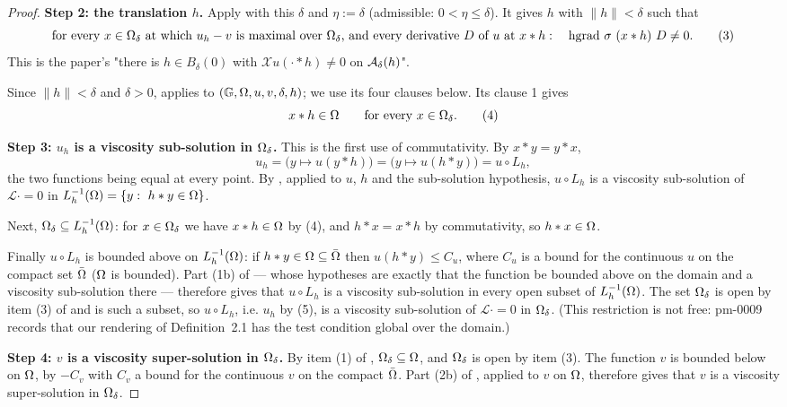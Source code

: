 \begin{proof}
\medskip\noindent\textbf{Step 2: the translation $h$.} Apply
 with this $\delta$ and $\eta:=\delta$ (admissible:
$0<\eta\le\delta$). It gives $h$ with $\|h\|<\delta$ such that
\[
 \text{for every } x\in\Omega_\delta \text{ at which } u_h-v \text{ is maximal over }\Omega_\delta
 \text{, and every derivative } D \text{ of } u \text{ at } x*h:\quad
 \mathrm{hgrad}\ \sigma\ (x*h)\ D\ne0 . \tag{3}
\]
This is the paper's "there is $h\in B_\delta(0)$ with $\mathcal Xu(\cdot*h)\ne0$ on
$\mathcal{A}_\delta(h)$".

Since $\|h\|<\delta$ and $\delta>0$,  applies to
$(\mathbb G,\Omega,u,v,\delta,h)$; we use its four clauses below. Its clause 1 gives
\[
 x*h\in\Omega\qquad\text{for every } x\in\Omega_\delta . \tag{4}
\]

\medskip\noindent\textbf{Step 3: $u_h$ is a viscosity sub-solution in $\Omega_\delta$.} This is
the first use of commutativity. By $x*y=y*x$,
\[
 u_h=\big(y\mapsto u(y*h)\big)=\big(y\mapsto u(h*y)\big)=u\circ L_h , \tag{5}
\]
the two functions being equal at every point. By , applied to
$u$, $h$ and the sub-solution hypothesis, $u\circ L_h$ is a viscosity sub-solution of
$\mathcal L\cdot=0$ in $L_h^{-1}(\Om)=\{y:\ h*y\in\Om\}$.

Next, $\Omega_\delta\subseteq L_h^{-1}(\Omega)$: for $x\in\Omega_\delta$ we have $x*h\in\Omega$ by (4),
and $h*x=x*h$ by commutativity, so $h*x\in\Omega$.

Finally $u\circ L_h$ is bounded above on $L_h^{-1}(\Omega)$: if $h*y\in\Omega\subseteq\bar{\Omega}$ then
$u(h*y)\le C_u$, where $C_u$ is a bound for the continuous $u$ on the compact set $\bar{\Omega}$
($\Omega$ is bounded). Part (1b) of  --- whose hypotheses are
exactly that the function be bounded above on the domain and a viscosity sub-solution there
--- therefore gives that $u\circ L_h$ is a viscosity sub-solution in every open subset of
$L_h^{-1}(\Omega)$. The set $\Omega_\delta$ is open by item (3) of 
and is such a subset, so $u\circ L_h$, i.e. $u_h$ by (5), is a viscosity sub-solution of
$\mathcal L\cdot=0$ in $\Omega_\delta$. (This restriction is not free: pm-0009 records that our
rendering of Definition~2.1 has the test condition global over the domain.)

\medskip\noindent\textbf{Step 4: $v$ is a viscosity super-solution in $\Omega_\delta$.} By item
(1) of , $\Omega_\delta\subseteq\Omega$, and $\Omega_\delta$ is open by
item (3). The function $v$ is bounded below on $\Omega$, by $-C_v$ with $C_v$ a bound for the
continuous $v$ on the compact $\bar{\Omega}$. Part (2b) of , applied
to $v$ on $\Omega$, therefore gives that $v$ is a viscosity super-solution in $\Omega_\delta$.


\end{proof}
